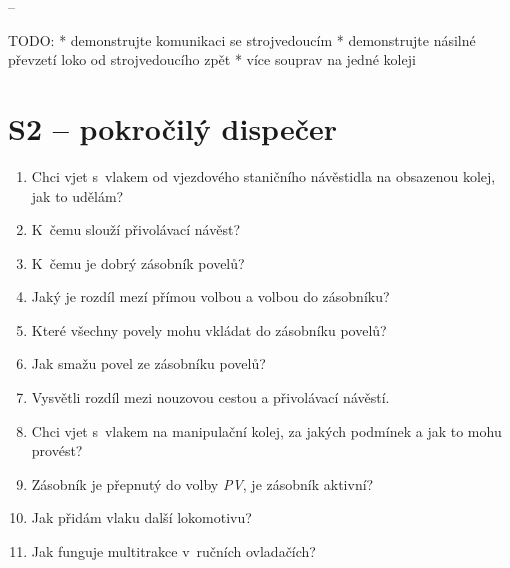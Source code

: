 \documentclass[12pt,a4paper]{article}
\begin{document}
--

TODO:
 * demonstrujte komunikaci se strojvedoucím
 * demonstrujte násilné převzetí loko od strojvedoucího zpět
 * více souprav na jedné koleji

\newpage
\section*{S2 – pokročilý dispečer}

\begin{enumerate}[leftmargin=*]
\item Chci vjet s~vlakem od vjezdového staničního návěstidla na obsazenou
kolej, jak to udělám?

\item K~čemu slouží přivolávací návěst?

\item K~čemu je dobrý zásobník povelů?

\item Jaký je rozdíl mezí přímou volbou a volbou do zásobníku?

\item Které všechny povely mohu vkládat do zásobníku povelů?

\item Jak smažu povel ze zásobníku povelů?

\item Vysvětli rozdíl mezi nouzovou cestou a přivolávací návěstí.

\item Chci vjet s~vlakem na manipulační kolej, za jakých podmínek a jak to mohu
provést?

\item Zásobník je přepnutý do volby \textit{PV}, je zásobník aktivní?

\item Jak přidám vlaku další lokomotivu?

\item Jak funguje multitrakce v~ručních ovladačích?

\end{enumerate}
\end{document}
